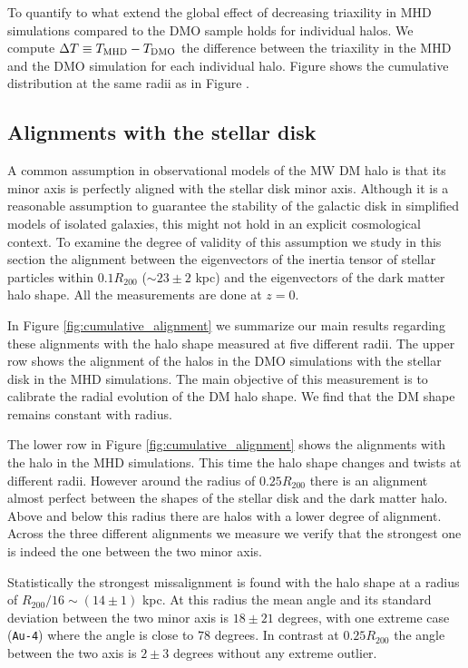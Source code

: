 \documentclass[a4paper,fleqn,usenatbib]{mnras}
\begin{document}
To quantify to what extend the global effect of decreasing
triaxility in MHD simulations compared to the DMO sample 
holds for individual halos. 
We compute $\Delta T\equiv T_{\rm MHD}-T_{\rm DMO}$ the difference between the
triaxility in the MHD and the DMO simulation for each individual halo. 
Figure \label{fig:delta_triaxial_cumulative} shows the cumulative
distribution at the same radii as in
Figure \label{fig:delta_triaxial_cumulative}. 
    

\subsection{Alignments with the stellar disk}


A common assumption in observational models of the MW DM halo is that
its minor axis is perfectly aligned with the stellar disk minor axis.
Although it is a reasonable assumption to guarantee the stability of
the galactic disk in simplified models of isolated galaxies, this
might not hold in an explicit cosmological context. 
To examine the degree of validity of this assumption we study in this
section the alignment between the eigenvectors of the inertia tensor of
stellar particles within $0.1R_{200}$ ($\sim 23\pm 2$ kpc) and the
eigenvectors of the dark matter halo shape.
All the measurements are done at $z=0$.

In Figure \ref{fig:cumulative_alignment} we summarize our main results
regarding these alignments with the halo shape measured at five
different radii.
The upper row shows the alignment of the halos in the DMO simulations
with the stellar disk in the MHD simulations.
The main objective of this measurement is to calibrate the radial
evolution of the DM halo shape. 
We find that the DM shape remains constant with radius.

The lower row in Figure \ref{fig:cumulative_alignment} shows the
alignments with the halo in the MHD simulations. 
This time the halo shape changes and twists at different radii.
However around the radius of $0.25R_{200}$ there is an alignment
almost perfect between the shapes of the stellar disk and the dark
matter halo. 
Above and below this radius there are halos with a lower degree of
alignment.
Across the three different alignments we measure we verify that the
strongest one is indeed the one between the two minor axis.

Statistically the strongest missalignment is found with the halo shape
at a radius of $R_{200}/16\sim (14\pm1)$ kpc. 
At this radius the mean angle and its standard deviation between the
two minor axis is $18 \pm 21$ degrees, with one extreme case
(\texttt{Au-4}) where the angle is close to $78$ degrees. 
In contrast at $0.25 R_{200}$ the angle between the two axis is
$2\pm 3$ degrees without any extreme outlier.
\end{document}
